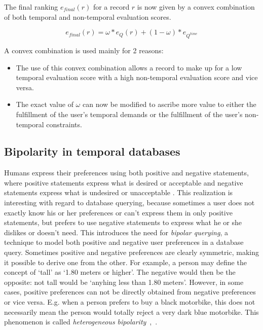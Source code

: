 The final ranking $e_{final}(r)$ for a record $r$ is now given by a convex combination of both temporal and non-temporal evaluation scores.

\begin{equation}
\label{eq:convex-combination}
e_{final} \left( r \right) = \omega \ast e_{Q} \left( r \right) + \left( 1- \omega \right) \ast e_{Q^{time}}
\end{equation}

A convex combination is used mainly for 2 reasons:
\begin{itemize}
	\item The use of this convex combination allows a record to make up for a low temporal evaluation score with a high non-temporal evaluation score and vice versa.
	\item The exact value of $\omega$ can now be modified to ascribe more value to either the fulfillment of the user's temporal demands or the fulfillment of the user's non-temporal constraints.
\end{itemize}

\subsection{Bipolarity in temporal databases}
\label{subsubsec:bipolarity}
Humans express their preferences using both positive and negative statements, where positive statements express what is desired or acceptable and negative statements express what is undesired or unacceptable \cite{Billiet:Pons:Matthe:DeTre:Pons:2011:BipolarFuzzy}. This realization is interesting with regard to database querying, because sometimes a user does not exactly know his or her preferences or can't express them in only positive statements, but prefers to use negative statements to express what he or she dislikes or doesn't need. This introduces the need for \emph{bipolar querying}, a technique to model both positive and negative user preferences in a database query. Sometimes positive and negative preferences are clearly symmetric, making it possible to derive one from the other. For example, a person may define the concept of `tall' as `1.80 meters or higher'. The negative would then be the opposite: not tall would be `anyhing less than 1.80 meters'. However, in some cases, positive preferences can not be directly obtained from negative preferences or vice versa. E.g. when a person prefers to buy a black motorbike, this does not necessarily mean the person would totally reject a very dark blue motorbike. This phenomenon is called \emph{heterogeneous bipolarity}~\cite{Dubois2006},~\cite{Dubois2008}.

